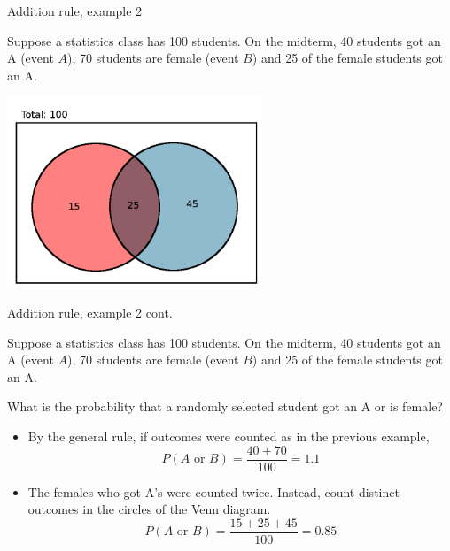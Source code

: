 \documentclass[xcolor=table, handout]{beamer}
\begin{document}
\begin{frame}{Addition rule, example 2}
\begin{block}{}
Suppose a statistics class has 100 students. On the midterm, 40 students got an A (event $A$),  70 students are female (event $B$) and 25 of the female students got an A.
\end{block}

{\centering
\includegraphics[width=3in]{../images/ch4_venn_ovr_ex}\par
}
\end{frame}

\begin{frame}{Addition rule, example 2 cont.}
\begin{block}{}
Suppose a statistics class has 100 students. On the midterm, 40 students got an A (event $A$),  70 students are female (event $B$) and 25 of the female students got an A.
\end{block}
\begin{exampleblock}{}
What is the probability that a randomly selected student got an A or is female?
\begin{itemize}
\pause
\item By the general rule, if outcomes were counted as in the previous example,
\[P(A \text{ or } B) = \frac {40 + 70}{100} = 1.1\]

\pause
\item The females who got A's were counted twice. Instead, count distinct outcomes in the circles of the Venn diagram.
\[P(A \text{ or } B) = \frac {15 + 25 + 45}{100} = 0.85\]

\end{itemize}
\end{exampleblock}

\end{frame}
\end{document}
